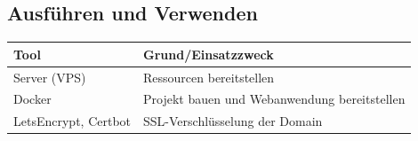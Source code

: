 \documentclass[a4paper,11pt]{scrartcl}
\begin{document}
\subsection{Ausführen und Verwenden}

\begin{table}[H]
\begin{center}
\begin{tabular}{|L{4cm}|L{8cm}|}
\hline
\textbf{Tool} &\textbf{Grund/Einsatzzweck} \\ \hline
Server (VPS) & Ressourcen bereitstellen\\ \hline
Docker & Projekt bauen und Webanwendung bereitstellen\\ \hline
LetsEncrypt, Certbot & SSL-Verschlüsselung der Domain\\ \hline
\end{tabular}
\end{center}
\end{table}


\end{document}
